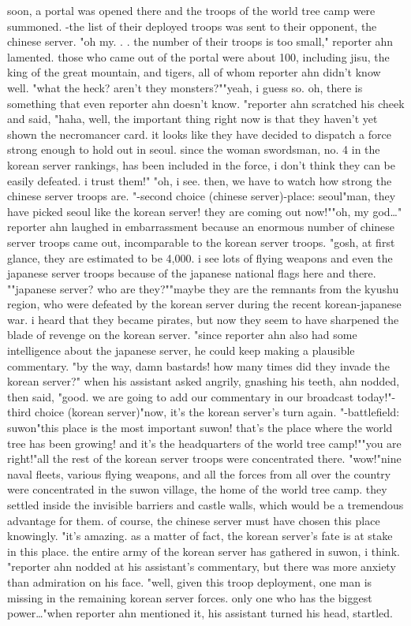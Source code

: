  soon, a portal was opened there and the troops of the world tree camp were summoned.
-the list of their deployed troops was sent to their opponent, the chinese server.
 "oh my.
.
.
the number of their troops is too small," reporter ahn lamented.
 those who came out of the portal were about 100, including jisu, the king of the great mountain, and tigers, all of whom reporter ahn didn't know well.
 "what the heck? aren't they monsters?""yeah, i guess so.
 oh, there is something that even reporter ahn doesn't know.
"reporter ahn scratched his cheek and said, "haha, well, the important thing right now is that they haven't yet shown the necromancer card.
 it looks like they have decided to dispatch a force strong enough to hold out in seoul.
 since the woman swordsman, no.
 4 in the korean server rankings, has been included in the force, i don't think they can be easily defeated.
 i trust them!"
"oh, i see.
 then, we have to watch how strong the chinese server troops are.
"-second choice (chinese server)-place: seoul"man, they have picked seoul like the korean server! they are coming out now!""oh, my god…" reporter ahn laughed in embarrassment because an enormous number of chinese server troops came out, incomparable to the korean server troops.
 "gosh, at first glance, they are estimated to be 4,000.
 i see lots of flying weapons and even the japanese server troops because of the japanese national flags here and there.
""japanese server? who are they?""maybe they are the remnants from the kyushu region, who were defeated by the korean server during the recent korean-japanese war.
 i heard that they became pirates, but now they seem to have sharpened the blade of revenge on the korean server.
"since reporter ahn also had some intelligence about the japanese server, he could keep making a plausible commentary.
 "by the way, damn bastards! how many times did they invade the korean server?" when his assistant asked angrily, gnashing his teeth, ahn nodded, then said, "good.
 we are going to add our commentary in our broadcast today!"-third choice (korean server)"now, it's the korean server's turn again.
"-battlefield: suwon"this place is the most important suwon! that's the place where the world tree has been growing! and it's the headquarters of the world tree camp!""you are right!"all the rest of the korean server troops were concentrated there.
"wow!"nine naval fleets, various flying weapons, and all the forces from all over the country were concentrated in the suwon village, the home of the world tree camp.
they settled inside the invisible barriers and castle walls, which would be a tremendous advantage for them.
 of course, the chinese server must have chosen this place knowingly.
"it's amazing.
 as a matter of fact, the korean server's fate is at stake in this place.
 the entire army of the korean server has gathered in suwon, i think.
"reporter ahn nodded at his assistant's commentary, but there was more anxiety than admiration on his face.
 "well, given this troop deployment, one man is missing in the remaining korean server forces.
 only one who has the biggest power…"when reporter ahn mentioned it, his assistant turned his head, startled.
 

